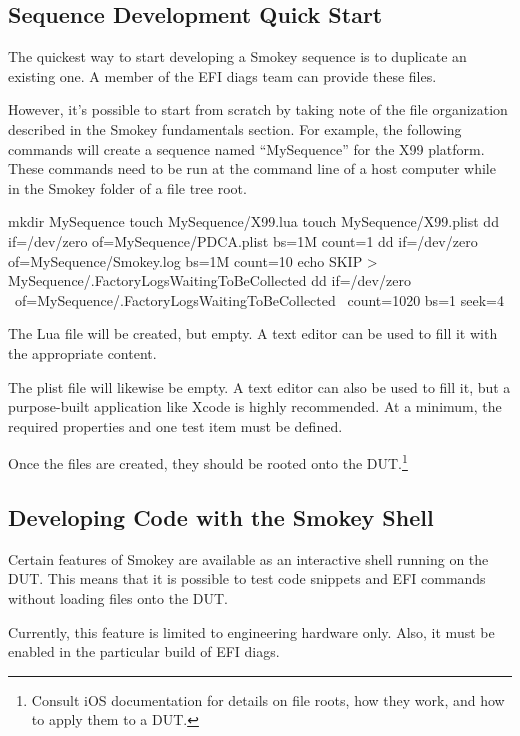 \subsection{Sequence Development Quick Start}

The quickest way to start developing a Smokey sequence is to duplicate an
existing one.  A member of the EFI diags team can provide these files.

However, it's possible to start from scratch by taking note of the file
organization described in the Smokey fundamentals section.  For example, the
following commands will create a sequence named ``MySequence'' for the X99
platform.  These commands need to be run at the command line of a host computer
while in the Smokey folder of a file tree root.

\begin{CommandLine}
mkdir MySequence
touch MySequence/X99.lua
touch MySequence/X99.plist
dd if=/dev/zero of=MySequence/PDCA.plist bs=1M count=1
dd if=/dev/zero of=MySequence/Smokey.log bs=1M count=10
echo SKIP > MySequence/.FactoryLogsWaitingToBeCollected
dd if=/dev/zero \
	of=MySequence/.FactoryLogsWaitingToBeCollected \
	count=1020 bs=1 seek=4
\end{CommandLine}

The Lua file will be created, but empty.  A text editor can be used to fill it
with the appropriate content.

The plist file will likewise be empty.  A text editor can also be used to fill
it, but a purpose-built application like Xcode is highly recommended.  At a
minimum, the required properties and one test item must be defined.

\CenterImage{Plist.png}

Once the files are created, they should be rooted onto the
DUT.\footnote{Consult iOS documentation for details on file roots, how they
work, and how to apply them to a DUT.}

\subsection{Developing Code with the Smokey Shell}

Certain features of Smokey are available as an interactive shell running on the
DUT.  This means that it is possible to test code snippets and EFI commands
without loading files onto the DUT.

Currently, this feature is limited to engineering hardware only.  Also, it must
be enabled in the particular build of EFI diags.

